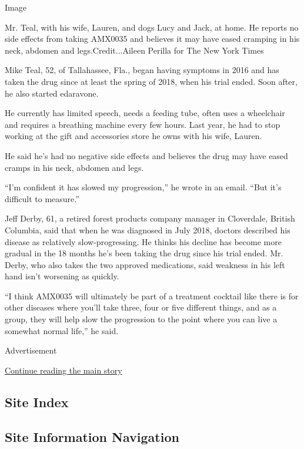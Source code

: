 Image

Mr. Teal, with his wife, Lauren, and dogs Lucy and Jack, at home. He
reports no side effects from taking AMX0035 and believes it may have
eased cramping in his neck, abdomen and legs.Credit...Aileen Perilla for
The New York Times

Mike Teal, 52, of Tallahassee, Fla., began having symptoms in 2016 and
has taken the drug since at least the spring of 2018, when his trial
ended. Soon after, he also started edaravone.

He currently has limited speech, needs a feeding tube, often uses a
wheelchair and requires a breathing machine every few hours. Last year,
he had to stop working at the gift and accessories store he owns with
his wife, Lauren.

He said he's had no negative side effects and believes the drug may have
eased cramps in his neck, abdomen and legs.

``I'm confident it has slowed my progression,'' he wrote in an email.
``But it's difficult to measure.''

Jeff Derby, 61, a retired forest products company manager in Cloverdale,
British Columbia, said that when he was diagnosed in July 2018, doctors
described his disease as relatively slow-progressing. He thinks his
decline has become more gradual in the 18 months he's been taking the
drug since his trial ended. Mr. Derby, who also takes the two approved
medications, said weakness in his left hand isn't worsening as quickly.

``I think AMX0035 will ultimately be part of a treatment cocktail like
there is for other diseases where you'll take three, four or five
different things, and as a group, they will help slow the progression to
the point where you can live a somewhat normal life,'' he said.

Advertisement

\protect\hyperlink{after-bottom}{Continue reading the main story}

\hypertarget{site-index}{%
\subsection{Site Index}\label{site-index}}

\hypertarget{site-information-navigation}{%
\subsection{Site Information
Navigation}\label{site-information-navigation}}

